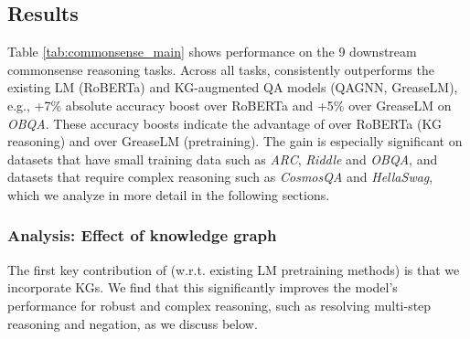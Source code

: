 \subsection{Results}
\label{sec:exp-result}

Table \ref{tab:commonsense_main} shows performance on the 9 downstream commonsense reasoning tasks. Across all tasks, \methodname consistently outperforms the existing LM (RoBERTa) and KG-augmented QA models (QAGNN, GreaseLM), e.g., +7\% absolute accuracy boost over RoBERTa and +5\% over GreaseLM on \textit{OBQA}. 
These accuracy boosts indicate the advantage of \methodname over RoBERTa (KG reasoning) and over GreaseLM (pretraining).
The gain is especially significant on datasets that have small training data such as \textit{ARC}, \textit{Riddle} and \textit{OBQA}, and datasets that require complex reasoning such as \textit{CosmosQA} and \textit{HellaSwag}, which we analyze in more detail in the following sections.



\subsubsection{Analysis: Effect of knowledge graph}
\label{sec:analysis-reasoning}
The first key contribution of \methodname (w.r.t. existing LM pretraining methods) is that we incorporate KGs.
We find that this significantly improves the model's performance for robust and complex reasoning, such as resolving multi-step reasoning and negation, as we discuss below.


